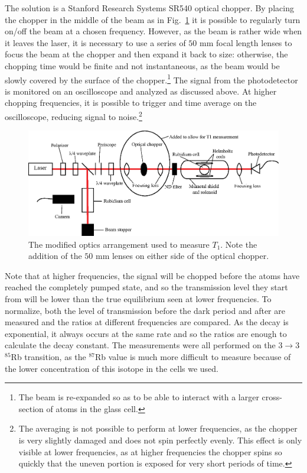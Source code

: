 The solution is a Stanford Research Systems SR540 optical chopper. By placing the chopper in the middle of the beam as in Fig.~\ref{fig:optics2} it is possible to regularly turn on/off the beam at a chosen frequency. However, as the beam is rather wide when it leaves the laser, it is necessary to use a series of $50$ mm focal length lenses to focus the beam at the chopper and then expand it back to size: otherwise, the chopping time would be finite and not instantaneous, as the beam would be slowly covered by the surface of the chopper.\footnote{The beam is re-expanded so as to be able to interact with a larger cross-section of atoms in the glass cell.} The signal from the photodetector is monitored on an oscilloscope and analyzed as discussed above. At higher chopping frequencies, it is possible to trigger and time average on the oscilloscope, reducing signal to noise.\footnote{The averaging is not possible to perform at lower frequencies, as the chopper is very slightly damaged and does not spin perfectly evenly. This effect is only visible at lower frequencies, as at higher frequencies the chopper spins so quickly that the uneven portion is exposed for very short periods of time.}


\begin{figure}[htbp]
\begin{center}
\includegraphics[width=6.5in]{./figures/optics2.eps}
\caption{\small{The modified optics arrangement used to measure $T_{1}$. Note the addition of the $50$ mm lenses on either side of the optical chopper.}}
\label{fig:optics2}
\end{center}
\end{figure}


Note that at higher frequencies, the signal will be chopped before the atoms have reached the completely pumped state, and so the transmission level they start from will be lower than the true equilibrium seen at lower frequencies. To normalize, both the level of transmission before the dark period and after are measured and the ratios at different frequencies are compared. As the decay is exponential, it always occurs at the same rate and so the ratios are enough to calculate the decay constant. The measurements were all performed on the $3\rightarrow3$ $^{85}$Rb transition, as the $^{87}$Rb value is much more difficult to measure because of the lower concentration of this isotope in the cells we used.

